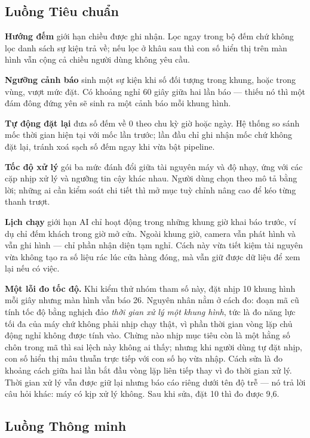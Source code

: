 \subsection{Luồng Tiêu chuẩn}

\textbf{Hướng đếm} giới hạn chiều được ghi nhận. Lọc ngay trong bộ đếm chứ không lọc
danh sách sự kiện trả về; nếu lọc ở khâu sau thì con số hiển thị trên màn hình vẫn
cộng cả chiều người dùng không yêu cầu.

\textbf{Ngưỡng cảnh báo} sinh một sự kiện khi số đối tượng trong khung, hoặc trong
vùng, vượt mức đặt. Có khoảng nghỉ 60 giây giữa hai lần báo --- thiếu nó thì một đám
đông đứng yên sẽ sinh ra một cảnh báo mỗi khung hình.

\textbf{Tự động đặt lại} đưa số đếm về 0 theo chu kỳ giờ hoặc ngày. Hệ thống so sánh
mốc thời gian hiện tại với mốc lần trước; lần đầu chỉ ghi nhận mốc chứ không đặt lại,
tránh xoá sạch số đếm ngay khi vừa bật pipeline.

\textbf{Tốc độ xử lý} gói ba mức đánh đổi giữa tài nguyên máy và độ nhạy, ứng với các
cặp nhịp xử lý và ngưỡng tin cậy khác nhau. Người dùng chọn theo mô tả bằng lời;
những ai cần kiểm soát chi tiết thì mở mục tuỳ chỉnh nâng cao để kéo từng thanh
trượt.

\textbf{Lịch chạy} giới hạn AI chỉ hoạt động trong những khung giờ khai báo trước, ví
dụ chỉ đếm khách trong giờ mở cửa. Ngoài khung giờ, camera vẫn phát hình và vẫn ghi
hình --- chỉ phần nhận diện tạm nghỉ. Cách này vừa tiết kiệm tài nguyên vừa không tạo
ra số liệu rác lúc cửa hàng đóng, mà vẫn giữ được dữ liệu để xem lại nếu có việc.


\textbf{Một lỗi đo tốc độ.} Khi kiểm thử nhóm tham số này, đặt nhịp 10 khung hình mỗi
giây nhưng màn hình vẫn báo 26. Nguyên nhân nằm ở cách đo: đoạn mã cũ tính tốc độ bằng
nghịch đảo \emph{thời gian xử lý một khung hình}, tức là đo năng lực tối đa của máy chứ
không phải nhịp chạy thật, vì phần thời gian vòng lặp chủ động nghỉ không được tính
vào. Chừng nào nhịp mục tiêu còn là một hằng số chôn trong mã thì sai lệch này không ai
thấy; nhưng khi người dùng tự đặt nhịp, con số hiển thị mâu thuẫn trực tiếp với con số
họ vừa nhập. Cách sửa là đo khoảng cách giữa hai lần bắt đầu vòng lặp liên tiếp thay vì
đo thời gian xử lý. Thời gian xử lý vẫn được giữ lại nhưng báo cáo riêng dưới tên độ
trễ --- nó trả lời câu hỏi khác: máy có kịp xử lý không. Sau khi sửa, đặt 10 thì đo
được 9{,}6.

\subsection{Luồng Thông minh}
\label{sub:thamso-tm}

